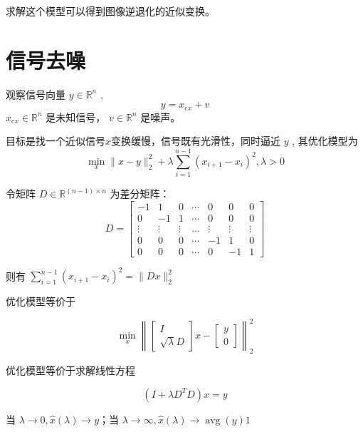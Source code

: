 求解这个模型可以得到图像逆退化的近似变换。





\section{信号去噪}

\begin{problem}[信号去噪问题]
    观察信号向量 $ y \in \mathbb{R}^{n} $ ,
\begin{equation}
y=x_{e x}+v
\end{equation}
$ x_{e x} \in \mathbb{R}^{n} $ 是未知信号， $ v \in \mathbb{R}^{n} $ 是噪声。






    目标是找一个近似信号$x$变换缓慢，信号既有光滑性，同时逼近 $ y $ , 其优化模型为
\begin{equation}
\min _{x}\|x-y\|_{2}^{2}+\lambda \sum_{i=1}^{n-1}\left(x_{i+1}-x_{i}\right)^{2}, \lambda>0
\end{equation}
\end{problem}


\begin{definition}[差分矩阵]
    令矩阵 $ D \in \mathbb{R}^{(n-1) \times n} $ 为差分矩阵：
\begin{equation} D=\left[\begin{array}{ccccccc}-1 & 1 & 0 & \cdots & 0 & 0 & 0 \\ 0 & -1 & 1 & \cdots & 0 & 0 & 0 \\ \vdots & \vdots & \vdots & \ldots & \vdots & \vdots & \vdots \\ 0 & 0 & 0 & \cdots & -1 & 1 & 0 \\ 0 & 0 & 0 & \cdots & 0 & -1 & 1\end{array}\right] \end{equation}

\end{definition}


则有 $ \sum_{i=1}^{n-1}\left(x_{i+1}-x_{i}\right)^{2}=\|D x\|_{2}^{2} $

优化模型等价于

\begin{equation} \min _{x}\left\|\left[\begin{array}{c}I \\ \sqrt{\lambda} D\end{array}\right] x-\left[\begin{array}{l}y \\ 0\end{array}\right]\right\|_{2}^{2} \end{equation}

优化模型等价于求解线性方程

\begin{equation}
\left(I+\lambda D^{T} D\right) x=y
\end{equation}

当 $ \lambda \rightarrow 0, \hat{x}(\lambda) \rightarrow y $；当 $ \lambda \rightarrow \infty, \hat{x}(\lambda) \rightarrow \operatorname{avg}(y) 1 $
